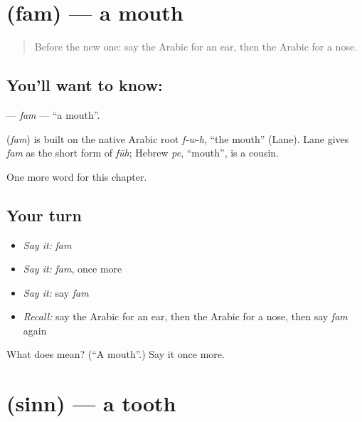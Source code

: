 \section[\texorpdfstring{\ar{فم} (fam)}{فم (fam)}]{ (fam) — a mouth}

\label{lesson:AR-C50-fam}



\begin{quote}
Before the new one: say the Arabic for an ear, then the Arabic for a nose.
\end{quote}

\subsection*{You'll want to know: }
\textbf{} — \emph{fam} — \textquotedblleft{}a mouth\textquotedblright{}.

\begin{cousinweb}
\textbf{} (\emph{fam}) is built on the native Arabic root \emph{f-w-h}, \textquotedblleft{}the mouth\textquotedblright{} (Lane). Lane gives \emph{fam} as the short form of \emph{fūh}; Hebrew \emph{pe}, \textquotedblleft{}mouth\textquotedblright{}, is a cousin.
\end{cousinweb}

\begin{grammarlens}[title={What you've built}]
One more word for this chapter.
\end{grammarlens}

\subsection*{Your turn}
\begin{itemize}
\raggedright
  \item \emph{Say it:} \emph{fam}
  \item \emph{Say it:} \emph{fam}, once more
  \item \emph{Say it:} say \emph{fam}
  \item \emph{Recall:} say the Arabic for an ear, then the Arabic for a nose, then say \emph{fam} again
\end{itemize}

\begin{tcolorbox}[breakable,colback=teal!4,colframe=teal!35!black,title={Before you move on}]
What does  mean? (\textquotedblleft{}A mouth\textquotedblright{}.) Say it once more.
\end{tcolorbox}
\section[\texorpdfstring{\ar{سن} (sinn)}{سن (sinn)}]{ (sinn) — a tooth}

